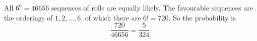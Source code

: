 All $6^6=46656$ sequences of rolls are equally likely. The favourable sequences are the orderings of $1,2,\dots,6$, of which there are $6!=720$. So the probability is
\[
\dfrac{720}{46656}=\boxed{\dfrac{5}{324}} .
\]
